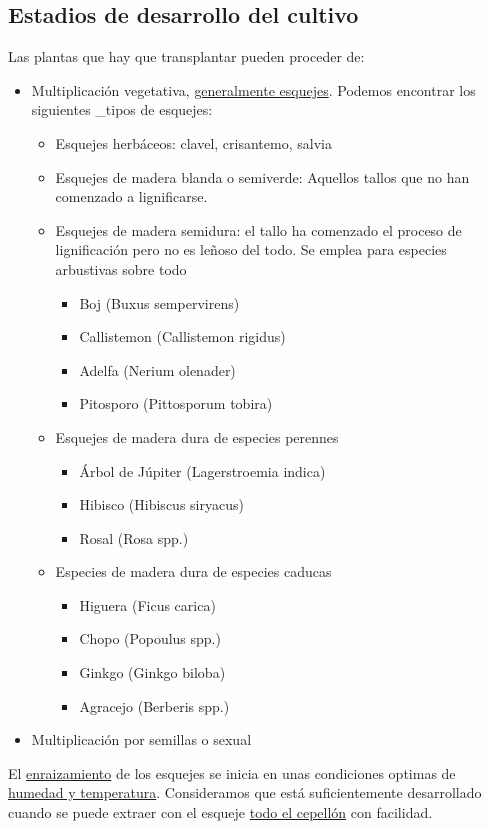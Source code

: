 \documentclass[a4paper,12pt,oneside]{article}
\begin{document}
\subsection{Estadios de desarrollo del cultivo}
\label{sec:orgd83cb82}
Las plantas que hay que transplantar pueden proceder de:
\begin{itemize}
\item Multiplicación vegetativa, \uline{generalmente esquejes}. Podemos encontrar los
siguientes \_tipos de esquejes:
\begin{itemize}
\item Esquejes herbáceos: clavel, crisantemo, salvia
\item Esquejes de madera blanda o semiverde: Aquellos tallos que no han comenzado
a lignificarse.
\item Esquejes de madera semidura: el tallo ha comenzado el proceso de
lignificación pero no es leñoso del todo. Se emplea para especies arbustivas
sobre todo
\begin{itemize}
\item Boj (Buxus sempervirens)
\item Callistemon (Callistemon rigidus)
\item Adelfa (Nerium olenader)
\item Pitosporo (Pittosporum tobira)
\end{itemize}
\item Esquejes de madera dura de especies perennes
\begin{itemize}
\item Árbol de Júpiter (Lagerstroemia indica)
\item Hibisco (Hibiscus siryacus)
\item Rosal (Rosa spp.)
\end{itemize}
\item Especies de madera dura de especies caducas
\begin{itemize}
\item Higuera (Ficus carica)
\item Chopo (Popoulus spp.)
\item Ginkgo (Ginkgo biloba)
\item Agracejo (Berberis spp.)
\end{itemize}
\end{itemize}
\item Multiplicación por semillas o sexual
\end{itemize}

El \uline{enraizamiento} de los esquejes se inicia en unas condiciones optimas de
\uline{humedad y temperatura}. Consideramos que está suficientemente desarrollado
cuando se puede extraer con el esqueje \uline{todo el cepellón} con facilidad.
\end{document}
